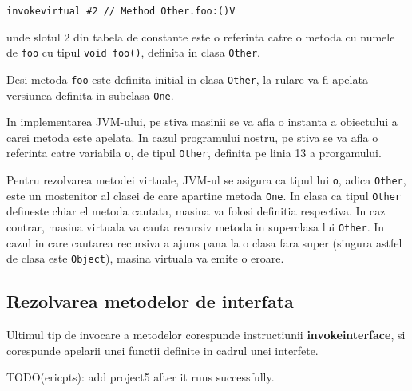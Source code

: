 \texttt{invokevirtual \#2                  // Method Other.foo:()V}

unde slotul 2 din tabela de constante este o referinta catre o metoda cu numele
de \texttt{foo} cu tipul \texttt{void foo()}, definita in clasa \texttt{Other}.

Desi metoda \texttt{foo} este definita initial in clasa \texttt{Other}, la
rulare va fi apelata versiunea definita in subclasa \texttt{One}.

In implementarea JVM-ului, pe stiva masinii se va afla o instanta a obiectului
a carei metoda este apelata. In cazul programului nostru, pe stiva se va afla o
referinta catre variabila \texttt{o}, de tipul \texttt{Other}, definita pe linia
13 a prorgamului.

Pentru rezolvarea metodei virtuale, JVM-ul se asigura ca tipul lui \texttt{o},
adica \texttt{Other}, este un mostenitor al clasei de care apartine metoda
\texttt{One}. In clasa ca tipul \texttt{Other} defineste chiar el metoda
cautata, masina va folosi definitia respectiva.
In caz contrar, masina virtuala va cauta recursiv metoda in superclasa lui
\texttt{Other}. In cazul in care cautarea recursiva a ajuns pana la o clasa fara
super (singura astfel de clasa este \texttt{Object}), masina virtuala va emite o
eroare.

\subsection{Rezolvarea metodelor de interfata}

Ultimul tip de invocare a metodelor corespunde instructiunii
\textbf{invokeinterface}, si corespunde apelarii unei functii definite in cadrul
unei interfete.

TODO(ericpts): add project5 after it runs successfully.
